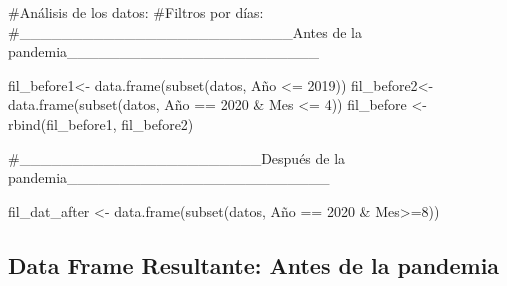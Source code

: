 \documentclass[
  us-letterpaper,
]{scrreprt}
\newenvironment{Shaded}{\begin{snugshade}}{\end{snugshade}}
\newcommand{\CommentTok}[1]{\textcolor[rgb]{0.37,0.37,0.37}{#1}}
\newcommand{\DecValTok}[1]{\textcolor[rgb]{0.68,0.00,0.00}{#1}}
\newcommand{\FunctionTok}[1]{\textcolor[rgb]{0.28,0.35,0.67}{#1}}
\newcommand{\NormalTok}[1]{\textcolor[rgb]{0.00,0.23,0.31}{#1}}
\newcommand{\OtherTok}[1]{\textcolor[rgb]{0.00,0.23,0.31}{#1}}
\newcommand{\SpecialCharTok}[1]{\textcolor[rgb]{0.37,0.37,0.37}{#1}}
\theoremstyle{plain}
\theoremstyle{plain}
\theoremstyle{definition}
\theoremstyle{remark}
\begin{document}
\begin{Shaded}
\begin{Highlighting}[]
\CommentTok{\#Análisis de los datos:}
\CommentTok{\#Filtros por días:}
\CommentTok{\#\_\_\_\_\_\_\_\_\_\_\_\_\_\_\_\_\_\_\_\_\_\_\_\_\_\_Antes de la pandemia\_\_\_\_\_\_\_\_\_\_\_\_\_\_\_\_\_\_\_\_\_\_\_\_}

\NormalTok{fil\_before1}\OtherTok{\textless{}{-}} \FunctionTok{data.frame}\NormalTok{(}\FunctionTok{subset}\NormalTok{(datos, Año }\SpecialCharTok{\textless{}=} \DecValTok{2019}\NormalTok{))}
\NormalTok{fil\_before2}\OtherTok{\textless{}{-}} \FunctionTok{data.frame}\NormalTok{(}\FunctionTok{subset}\NormalTok{(datos, Año }\SpecialCharTok{==} \DecValTok{2020} \SpecialCharTok{\&}\NormalTok{ Mes }\SpecialCharTok{\textless{}=} \DecValTok{4}\NormalTok{))}
\NormalTok{fil\_before }\OtherTok{\textless{}{-}} \FunctionTok{rbind}\NormalTok{(fil\_before1, fil\_before2)}

\CommentTok{\#\_\_\_\_\_\_\_\_\_\_\_\_\_\_\_\_\_\_\_\_\_\_\_Después de la pandemia\_\_\_\_\_\_\_\_\_\_\_\_\_\_\_\_\_\_\_\_\_\_\_\_\_}

\NormalTok{fil\_dat\_after }\OtherTok{\textless{}{-}} \FunctionTok{data.frame}\NormalTok{(}\FunctionTok{subset}\NormalTok{(datos, Año }\SpecialCharTok{==} \DecValTok{2020} \SpecialCharTok{\&}\NormalTok{ Mes}\SpecialCharTok{\textgreater{}=}\DecValTok{8}\NormalTok{))}
\end{Highlighting}
\end{Shaded}

\subsection{Data Frame Resultante: Antes de la
pandemia}\label{data-frame-resultante-antes-de-la-pandemia}
\end{document}
